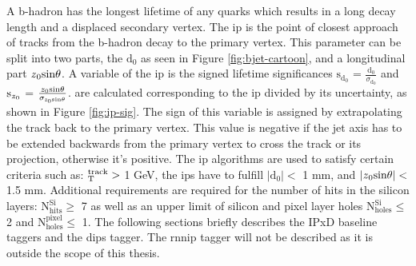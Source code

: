 A b-hadron has the longest lifetime of any quarks which results in a long decay length and a displaced secondary vertex. The \gls{ip} is the point of closest approach of 
tracks from the b-hadron decay to the primary vertex. This parameter can be split into two parts, the $\textrm{d}_{\textrm{0}}$ as seen in Figure \ref{fig:bjet-cartoon}, and 
a longitudinal part $\textrm{\textit{z}}_{\textrm{0}} \textrm{sin}{\theta}$. A variable of the \gls{ip} is the signed lifetime significances $\textrm{s}_{\textrm{d}_{\textrm{0}}}$ 
= $\frac{\textrm{d}_{\textrm{0}}}{\sigma_{\textrm{d}_{\textrm{0}}}}$ and $\textrm{s}_{\textrm{\textit{z}}_{\textrm{0}}}$ = $ \frac{\textrm{\textit{z}}_{\textrm{0}} \textrm{sin}{\theta}}{\sigma_{\textrm{\textit{z}}_{\textrm{0}} \textrm{sin}{\theta}}}$.
are calculated corresponding to the \gls{ip} divided by its uncertainty, as shown in Figure \ref{fig:ip-sig}. The sign of this variable is assigned by extrapolating the track back to the 
primary vertex. This value is negative if the jet axis has to be extended backwards from the primary vertex to cross the track or its projection, otherwise it's positive. 
The \gls{ip} algorithms are used to satisfy certain criteria such as: $\textrm{\textit{}}_{\textrm{T}}^{\textrm{track}} >$ 1 GeV, the \gls{ip}s have to fulfill  $|\textrm{d}_{\textrm{0}}| < $ 
1 mm, and $|\textrm{\textit{z}}_{\textrm{0}} \textrm{sin}{\theta}| <$ 1.5 mm. Additional requirements are required for the number of hits in the silicon layers: $\textrm{N}_{\textrm{hits}}^{\textrm{Si}}
\geq$ 7 as well as an upper limit of silicon and pixel layer holes  $\textrm{N}_{\textrm{holes}}^{\textrm{Si}} \leq$ 2 and  $\textrm{N}_{\textrm{holes}}^{\textrm{pixel}} \leq$ 1.
The following sections briefly describes the IPxD baseline taggers and the \gls{dips} tagger. The \gls{rnnip} tagger will not be described as it is outside the scope of this thesis.
